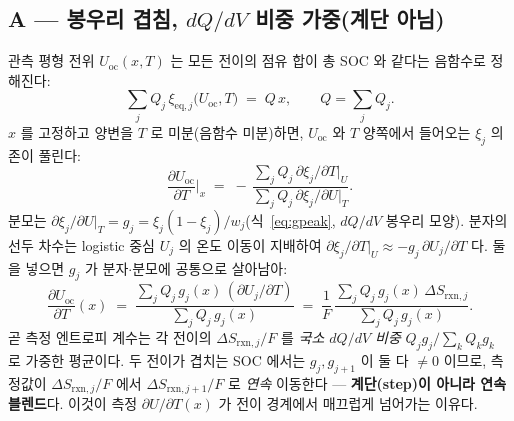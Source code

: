\documentclass[11pt,a4paper]{article}
\newcommand{\rxn}{\mathrm{rxn}}
\newcommand{\eq}{\mathrm{eq}}
\newcommand{\oc}{\mathrm{oc}}
\begin{document}
\subsection{A — 봉우리 겹침, $dQ/dV$ 비중 가중(계단 아님)}\label{sec:overlapA}
관측 평형 전위 $U_\oc(x,T)$ 는 모든 전이의 점유 합이 총 SOC 와 같다는 음함수로 정해진다:
\begin{equation}
\sum_j Q_j\,\xi_{\eq,j}\big(U_\oc,T\big) \;=\; Q\,x,
\qquad Q=\sum_j Q_j.
\label{eq:implicit}
\end{equation}
$x$ 를 고정하고 양변을 $T$ 로 미분(음함수 미분)하면, $U_\oc$ 와 $T$ 양쪽에서 들어오는 $\xi_j$ 의존이
풀린다:
\begin{equation}
\frac{\partial U_\oc}{\partial T}\Big|_x
  \;=\; -\,\frac{\sum_j Q_j\,\partial\xi_j/\partial T|_U}{\sum_j Q_j\,\partial\xi_j/\partial U|_T}.
\label{eq:implicit_diff}
\end{equation}
분모는 $\partial\xi_j/\partial U|_T = g_j = \xi_j(1-\xi_j)/w_j$(식~\eqref{eq:gpeak}, $dQ/dV$ 봉우리 모양).
분자의 선두 차수는 logistic 중심 $U_j$ 의 온도 이동이 지배하여 $\partial\xi_j/\partial T|_U\approx
-g_j\,\partial U_j/\partial T$ 다. 둘을 넣으면 $g_j$ 가 분자$\cdot$분모에 공통으로 살아남아:
\begin{equation}
\boxed{\;
\frac{\partial U_\oc}{\partial T}(x)
  \;=\; \frac{\sum_j Q_j\,g_j(x)\,(\partial U_j/\partial T)}{\sum_j Q_j\,g_j(x)}
  \;=\; \frac{1}{F}\,\frac{\sum_j Q_j\,g_j(x)\,\Delta S_{\rxn,j}}{\sum_j Q_j\,g_j(x)}.
\;}
\label{eq:weighted}
\end{equation}
곧 측정 엔트로피 계수는 각 전이의 $\Delta S_{\rxn,j}/F$ 를 \emph{국소 $dQ/dV$ 비중} $Q_jg_j/\sum_kQ_kg_k$
로 가중한 평균이다. 두 전이가 겹치는 SOC 에서는 $g_j,g_{j+1}$ 이 둘 다 $\ne0$ 이므로, 측정값이
$\Delta S_{\rxn,j}/F$ 에서 $\Delta S_{\rxn,j+1}/F$ 로 \emph{연속} 이동한다 — \textbf{계단(step)이 아니라
연속 블렌드}다. 이것이 측정 $\partial U/\partial T(x)$ 가 전이 경계에서 매끄럽게 넘어가는 이유다.
\end{document}
